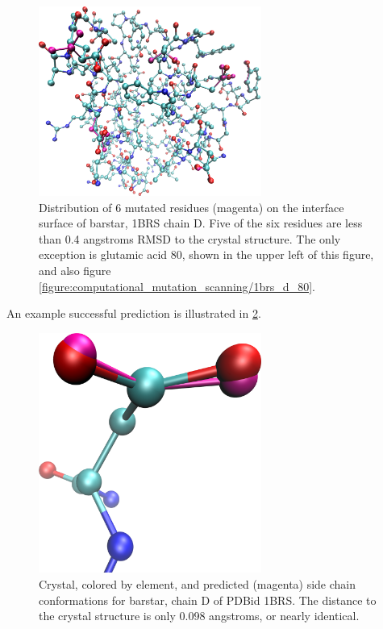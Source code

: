 \begin{figure}[h]
\centering
\includegraphics[width=0.65\textwidth,height=0.3\textheight,keepaspectratio]{figures/mutation_side_chain_images/1brs_all.png}
\caption{Distribution of 6 mutated residues (magenta) on the interface surface of barstar, 1BRS chain D.
Five of the six residues are less than 0.4 angstroms RMSD to the crystal structure.
The only exception is glutamic acid 80, shown in the upper left of this figure, and also figure \protect\ref{figure:computational_mutation_scanning/1brs_d_80}.}
\label{figure:computational_mutation_scanning/1brs_all}
\end{figure}

An example successful prediction is illustrated in \ref{figure:computational_mutation_scanning/1brs_d_35}.
\begin{figure}[h]
    \centering
    \includegraphics[width=0.65\textwidth,height=0.3\textheight,keepaspectratio]{figures/mutation_side_chain_images/1brs_chain_d_35.png}
    \caption{Crystal, colored by element, and predicted (magenta) side chain conformations for barstar, chain D of PDBid 1BRS.
    The distance to the crystal structure is only 0.098 angstroms, or nearly identical.}
    \label{figure:computational_mutation_scanning/1brs_d_35}
\end{figure}

